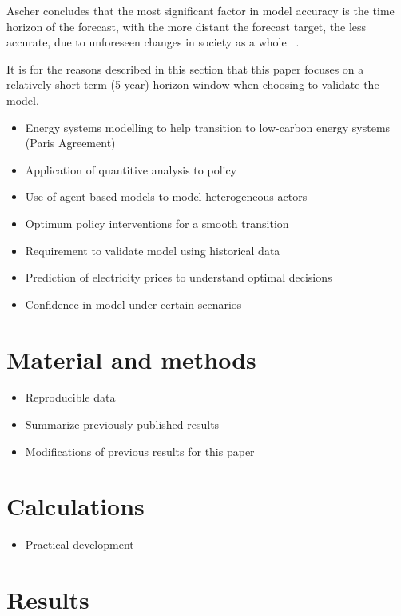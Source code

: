 \documentclass[final,3p,times,twocolumn,numbers]{elsarticle}
\begin{document}
Ascher concludes that the most significant factor in model accuracy is the time horizon of the forecast, with the more distant the forecast target, the less accurate, due to unforeseen changes in society as a whole ~\cite{gillespie_1979}.

It is for the reasons described in this section that this paper focuses on a relatively short-term (5 year) horizon window when choosing to validate the model. 


\begin{itemize}
	\item Energy systems modelling to help transition to low-carbon energy systems (Paris Agreement)
	\item Application of quantitive analysis to policy
	\item Use of agent-based models to model heterogeneous actors
	\item Optimum policy interventions for a smooth transition
	\item Requirement to validate model using historical data
	\item Prediction of electricity prices to understand optimal decisions
	\item Confidence in model under certain scenarios
\end{itemize}



\section{Material and methods}
\label{sec:methods}
\begin{itemize}
	\item Reproducible data
	\item Summarize previously published results
	\item Modifications of previous results for this paper
\end{itemize}

\section{Calculations}
\label{sec:calculations}

\begin{itemize}
	\item Practical development
\end{itemize}

\section{Results}
\label{sec:results}
\end{document}
